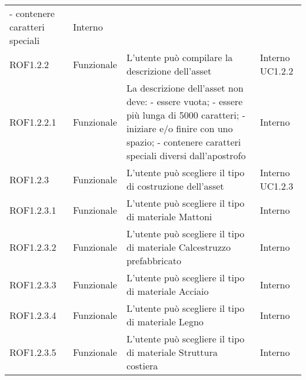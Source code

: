 \begin{longtable}{p{2cm}!{\VRule[1pt]}p{2cm}!{\VRule[1pt]}p{5cm}!{\VRule[1pt]}p{1.5cm}}
	- contenere caratteri speciali & Interno \\
	ROF1.2.2                         & Funzionale\newline               & L'utente può compilare la descrizione dell'asset                                                                         & Interno \newline UC1.2.2     
	\\
	ROF1.2.2.1&Funzionale\newline  & La descrizione dell'asset non deve:
	- essere vuota;
	- essere più lunga di 5000 caratteri; 
	- iniziare e/o finire con uno spazio;
	- contenere caratteri speciali diversi dall'apostrofo & Interno \\
	ROF1.2.3                         & Funzionale\newline               & L'utente può scegliere il tipo di costruzione dell'asset                                                                 & Interno \newline UC1.2.3     
	\\
	ROF1.2.3.1                       & Funzionale\newline               & L'utente può scegliere il tipo di materiale Mattoni                                                                      & Interno                      \\
	ROF1.2.3.2                       & Funzionale\newline               & L'utente può scegliere il tipo di materiale Calcestruzzo prefabbricato                                                   & Interno                      \\
	ROF1.2.3.3                       & Funzionale\newline               & L'utente può scegliere il tipo di materiale Acciaio                                                                      & Interno                      \\
	ROF1.2.3.4                       & Funzionale\newline               & L'utente può scegliere il tipo di materiale Legno                                                                        & Interno                      \\
	ROF1.2.3.5                       & Funzionale\newline               & L'utente può scegliere il tipo di materiale Struttura costiera                                                           & Interno                      \\

\end{longtable}
